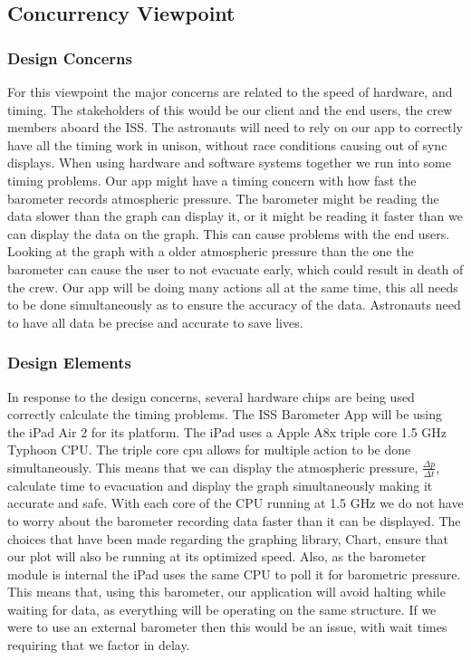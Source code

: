 \documentclass[onecolumn, draftclsnofoot,10pt, compsoc]{IEEEtran}
\begin{document}
\subsection{Concurrency Viewpoint}
\subsubsection{Design Concerns}
For this viewpoint the major concerns are related to the speed of hardware, and timing.
The stakeholders of this would be our client and the end users, the crew members aboard the ISS.
The astronauts will need to rely on our app to correctly have all the timing work in unison, without race conditions causing out of sync displays.
When using hardware and software systems together we run into some timing problems.
Our app might have a timing concern with how fast the barometer records atmospheric pressure.
The barometer might be reading the data slower than the graph can display it, or it might be reading it faster than we can display the data on the graph.
This can cause problems with the end users.
Looking at the graph with a older atmospheric pressure than the one the barometer can cause the user to not evacuate early, which could result in death of the crew.
Our app will be doing many actions all at the same time, this all needs to be done simultaneously as to ensure the accuracy of the data.
Astronauts need to have all data be precise and accurate to save lives.

\subsubsection{Design Elements}
In response to the design concerns, several hardware chips are being used correctly calculate the timing problems.
The ISS Barometer App will be using the iPad Air 2 for its platform. The iPad uses a Apple A8x triple core 1.5 GHz Typhoon CPU.
The triple core cpu allows for multiple action to be done simultaneously.
This means that we can display the atmospheric pressure, $\frac{\Delta p}{\Delta t}$, calculate time to evacuation and display the graph simultaneously making it accurate and safe.
With each core of the CPU running at 1.5 GHz we do not have to worry about the barometer recording data faster than it can be displayed.
The choices that have been made regarding the graphing library, Chart, ensure that our plot will also be running at its optimized speed.
Also, as the barometer module is internal the iPad uses the same CPU to poll it for barometric pressure.
This means that, using this barometer, our application will avoid halting while waiting for data, as everything will be operating on the same structure.
If we were to use an external barometer then this would be an issue, with wait times requiring that we factor in delay.
\end{document}
